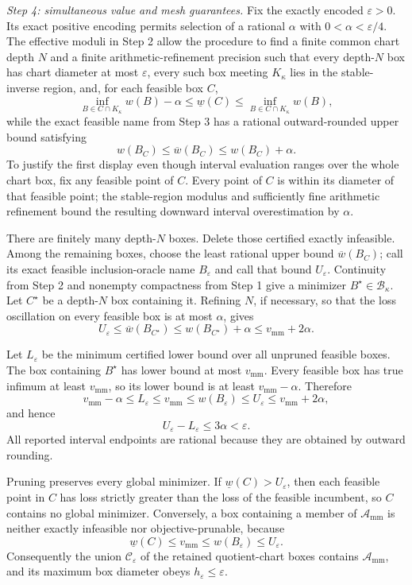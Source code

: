 \emph{Step 4: simultaneous value and mesh guarantees.}
Fix the exactly encoded \(\varepsilon>0\).  Its exact positive encoding permits selection of a rational \(\alpha\) with \(0<\alpha<\varepsilon/4\).  The effective moduli in Step 2 allow the procedure to find a finite common chart depth \(N\) and a finite arithmetic-refinement precision such that every depth-\(N\) box has chart diameter at most \(\varepsilon\), every such box meeting \(K_\kappa\) lies in the stable-inverse region, and, for each feasible box \(C\),
\[
\inf_{B\in C\cap K_\kappa}w(B)-\alpha
\le \underline w(C)
\le \inf_{B\in C\cap K_\kappa}w(B),
\]
while the exact feasible name from Step 3 has a rational outward-rounded upper bound satisfying
\[
w(B_C)\le\overline w(B_C)\le w(B_C)+\alpha.
\]
To justify the first display even though interval evaluation ranges over the whole chart box, fix any feasible point of \(C\).  Every point of \(C\) is within its diameter of that feasible point; the stable-region modulus and sufficiently fine arithmetic refinement bound the resulting downward interval overestimation by \(\alpha\).

There are finitely many depth-\(N\) boxes.  Delete those certified exactly infeasible.  Among the remaining boxes, choose the least rational upper bound \(\overline w(B_C)\); call its exact feasible inclusion-oracle name \(B_\varepsilon\) and call that bound \(U_\varepsilon\).  Continuity from Step 2 and nonempty compactness from Step 1 give a minimizer \(B^\star\in\mathcal B_\kappa\).  Let \(C^\star\) be a depth-\(N\) box containing it.  Refining \(N\), if necessary, so that the loss oscillation on every feasible box is at most \(\alpha\), gives
\[
U_\varepsilon
\le\overline w(B_{C^\star})
\le w(B_{C^\star})+\alpha
\le v_{\mathrm{mm}}+2\alpha.
\]

Let \(L_\varepsilon\) be the minimum certified lower bound over all unpruned feasible boxes.  The box containing \(B^\star\) has lower bound at most \(v_{\mathrm{mm}}\).  Every feasible box has true infimum at least \(v_{\mathrm{mm}}\), so its lower bound is at least \(v_{\mathrm{mm}}-\alpha\).  Therefore
\[
v_{\mathrm{mm}}-\alpha
\le L_\varepsilon
\le v_{\mathrm{mm}}
\le w(B_\varepsilon)
\le U_\varepsilon
\le v_{\mathrm{mm}}+2\alpha,
\]
and hence
\[
U_\varepsilon-L_\varepsilon\le3\alpha<\varepsilon.
\]
All reported interval endpoints are rational because they are obtained by outward rounding.

Pruning preserves every global minimizer.  If \(\underline w(C)>U_\varepsilon\), then each feasible point in \(C\) has loss strictly greater than the loss of the feasible incumbent, so \(C\) contains no global minimizer.  Conversely, a box containing a member of \(\mathcal A_{\mathrm{mm}}\) is neither exactly infeasible nor objective-prunable, because
\[
\underline w(C)\le v_{\mathrm{mm}}
\le w(B_\varepsilon)
\le U_\varepsilon.
\]
Consequently the union \(\mathcal C_\varepsilon\) of the retained quotient-chart boxes contains \(\mathcal A_{\mathrm{mm}}\), and its maximum box diameter obeys \(h_\varepsilon\le\varepsilon\).

